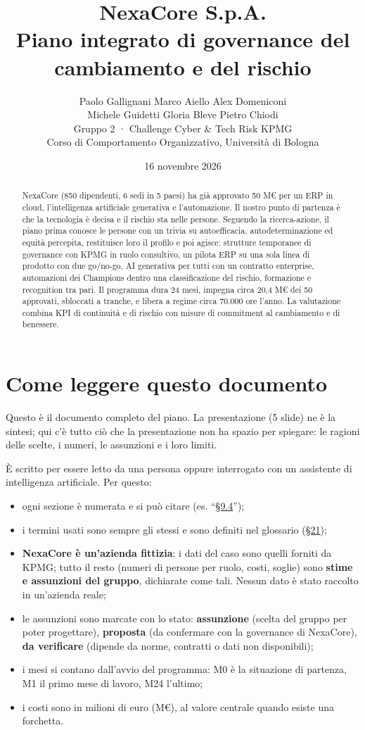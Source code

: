 \documentclass[11pt,a4paper]{article}
\title{\textbf{NexaCore S.p.A.}\\[4pt]\Large Piano integrato di governance del cambiamento e del rischio}
\author{Paolo Gallignani \quad Marco Aiello \quad Alex Domeniconi\\
Michele Guidetti \quad Gloria Bleve \quad Pietro Chiodi\\[10pt]
\small Gruppo 2 · Challenge Cyber \& Tech Risk KPMG\\
\small Corso di Comportamento Organizzativo, Università di Bologna}
\date{16 novembre 2026}
\begin{document}
\maketitle
\thispagestyle{empty}

\begin{abstract}
\noindent NexaCore (850 dipendenti, 6 sedi in 5 paesi) ha già approvato 50 M€ per un ERP in cloud, l'intelligenza artificiale generativa e l'automazione. Il nostro punto di partenza è che la tecnologia è decisa e il rischio sta nelle persone. Seguendo la ricerca-azione, il piano prima conosce le persone con un trivia su autoefficacia, autodeterminazione ed equità percepita, restituisce loro il profilo e poi agisce: strutture temporanee di governance con KPMG in ruolo consultivo, un pilota ERP su una sola linea di prodotto con due go/no-go, AI generativa per tutti con un contratto enterprise, automazioni dei Champions dentro una classificazione del rischio, formazione e recognition tra pari. Il programma dura 24 mesi, impegna circa 20,4 M€ dei 50 approvati, sbloccati a tranche, e libera a regime circa 70.000 ore l'anno. La valutazione combina KPI di continuità e di rischio con misure di commitment al cambiamento e di benessere.
\end{abstract}

\newpage
\tableofcontents
\newpage


\section*{Come leggere questo documento}

Questo è il documento completo del piano. La presentazione (5 slide) ne è la sintesi; qui c'è tutto ciò che la presentazione non ha spazio per spiegare: le ragioni delle scelte, i numeri, le assunzioni e i loro limiti.

È scritto per essere letto da una persona oppure interrogato con un assistente di intelligenza artificiale. Per questo:
\begin{itemize}
\item ogni sezione è numerata e si può citare (es. ``\hyperref[sec:9.4]{\S9.4}'');
\item i termini usati sono sempre gli stessi e sono definiti nel glossario (\hyperref[sec:21]{\S21});
\item \textbf{NexaCore è un'azienda fittizia}: i dati del caso sono quelli forniti da KPMG; tutto il resto (numeri di persone per ruolo, costi, soglie) sono \textbf{stime e assunzioni del gruppo}, dichiarate come tali. Nessun dato è stato raccolto in un'azienda reale;
\item le assunzioni sono marcate con lo stato: \textbf{assunzione} (scelta del gruppo per poter progettare), \textbf{proposta} (da confermare con la governance di NexaCore), \textbf{da verificare} (dipende da norme, contratti o dati non disponibili);
\item i mesi si contano dall'avvio del programma: M0 è la situazione di partenza, M1 il primo mese di lavoro, M24 l'ultimo;
\item i costi sono in milioni di euro (M€), al valore centrale quando esiste una forchetta.
\end{itemize}
\end{document}
